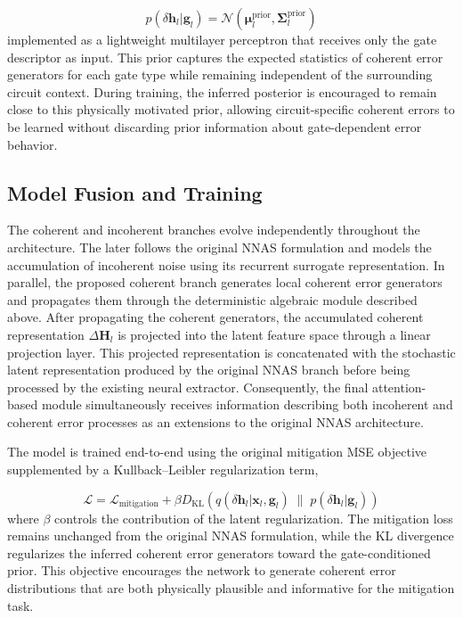 \begin{equation}
    p(\delta\mathbf{h}_l|\mathbf{g}_l) = \mathcal{N}
    (\boldsymbol{\mu}^\text{prior}_l, \mathbf{\Sigma}^\text{prior}_l)
\end{equation}
implemented as a lightweight multilayer perceptron that receives only the gate descriptor as input. This prior captures the expected statistics of coherent error generators for each gate type while remaining independent of the surrounding circuit context. During training, the inferred posterior is encouraged to remain close to this physically motivated prior, allowing circuit-specific coherent errors to be learned without discarding prior information about gate-dependent error behavior.


\subsection{Model Fusion and Training}

The coherent and incoherent branches evolve independently throughout the architecture. The later follows the original NNAS formulation and models the accumulation of incoherent noise using its recurrent surrogate representation. In parallel, the proposed coherent branch generates local coherent error generators and propagates them through the deterministic algebraic module described above.
After propagating the coherent generators, the accumulated coherent representation $\Delta\mathbf{H}_l$ is projected into the latent feature space through a linear projection layer. This projected representation is concatenated with the stochastic latent representation produced by the original NNAS branch before being processed by the existing neural extractor. Consequently, the final attention-based module simultaneously receives information describing both incoherent and coherent error processes as an extensions to the original NNAS architecture.

The model is trained end-to-end using the original mitigation MSE objective supplemented by a Kullback--Leibler regularization term,

\begin{equation}
    \mathcal{L} = \mathcal{L}_{\mathrm{mitigation}}
    +
    \beta D_{\mathrm{KL}}\left(q(\delta\mathbf{h}_l|\mathbf{x}_l,\mathbf{g}_l)\;\|\;p(\delta\mathbf{h}_l|\mathbf{g}_l)\right)    
\end{equation}
where $\beta$ controls the contribution of the latent regularization. The mitigation loss remains unchanged from the original NNAS formulation, while the KL divergence regularizes the inferred coherent error generators toward the gate-conditioned prior. This objective encourages the network to generate coherent error distributions that are both physically plausible and informative for the mitigation task.

